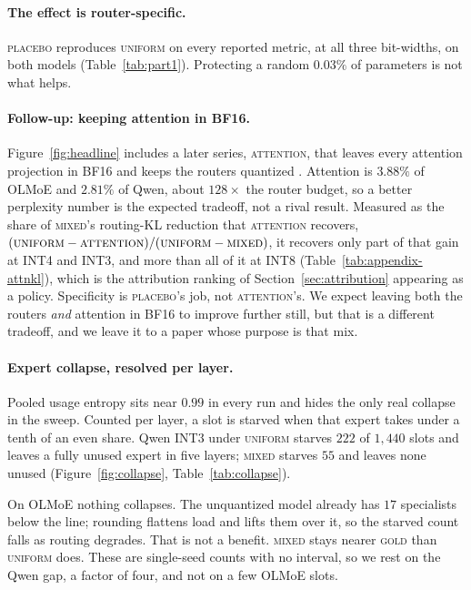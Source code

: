 \documentclass[11pt]{article}
\newcommand{\gold}{\textsc{gold}}
\newcommand{\uniform}{\textsc{uniform}}
\newcommand{\mixed}{\textsc{mixed}}
\newcommand{\placebo}{\textsc{placebo}}
\newcommand{\attn}{\textsc{attention}}
\begin{document}
\paragraph{The effect is router-specific.}
\placebo{} reproduces \uniform{} on every reported metric, at all three
bit-widths, on both models (Table~\ref{tab:part1}). Protecting a random
$0.03\%$ of parameters is not what helps.

\paragraph{Follow-up: keeping attention in BF16.}
Figure~\ref{fig:headline} includes a later series, \attn{}, that leaves
every attention projection in BF16 and keeps the routers quantized
\citep{kim2023moqe}. Attention is $3.88\%$ of OLMoE and $2.81\%$ of Qwen,
about $128\times$ the router budget, so a better perplexity number is the
expected tradeoff, not a rival result. Measured as the share of
\mixed{}'s routing-KL reduction that \attn{} recovers,
$(\uniform{}-\attn{})/(\uniform{}-\mixed{})$, it recovers only part of
that gain at INT4 and INT3, and more than all of it at INT8
(Table~\ref{tab:appendix-attnkl}), which is the attribution ranking of
Section~\ref{sec:attribution} appearing as a policy. Specificity is
\placebo{}'s job, not \attn{}'s. We expect leaving both the routers
\emph{and} attention in BF16 to improve further still, but that is a
different tradeoff, and we leave it to a paper whose purpose is that mix.

\paragraph{Expert collapse, resolved per layer.}
Pooled usage entropy sits near $0.99$ in every run and hides the only
real collapse in the sweep. Counted per layer, a slot is starved when
that expert takes under a tenth of an even share. Qwen INT3 under
\uniform{} starves $222$ of $1{,}440$ slots and leaves a fully unused
expert in five layers; \mixed{} starves $55$ and leaves none unused
(Figure~\ref{fig:collapse}, Table~\ref{tab:collapse}).

On OLMoE nothing collapses. The unquantized model already has $17$
specialists below the line; rounding flattens load and lifts them over
it, so the starved count falls as routing degrades. That is not a
benefit. \mixed{} stays nearer \gold{} than \uniform{} does. These are
single-seed counts with no interval, so we rest on the Qwen gap, a factor
of four, and not on a few OLMoE slots.
\end{document}
